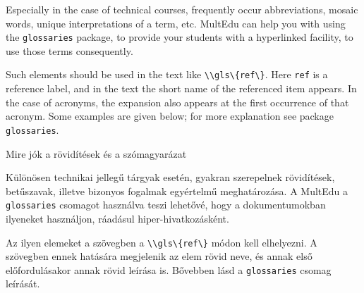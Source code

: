 




{
Especially in the case of technical courses, frequently occur abbreviations, mosaic words, unique interpretations of a term, etc. MultEdu can help you
with using the \lstinline|glossaries| package, to provide your students 
with a hyperlinked facility, to use those terms consequently.

Such elements should be used in the text like \lstinline|\\gls\{ref\}|.
Here \lstinline|ref| is a reference label, and in the text the short 
name of the referenced item appears. In the case of acronyms, the 
expansion also appears at the first occurrence of that acronym.
Some examples are given below; for more explanation see package \lstinline|glossaries|.

}
{Mire jók a rövidítések és a szómagyarázat}
{

Különösen technikai jellegű tárgyak esetén, gyakran szerepelnek 
rövidítések, betűszavak, illetve bizonyos fogalmak egyértelmű meghatározása.
A MultEdu a \lstinline|glossaries| csomagot használva teszi lehetővé,
hogy a dokumentumokban ilyeneket használjon, ráadásul hiper-hivatkozásként.
 
Az ilyen elemeket a szövegben  a \lstinline|\\gls\{ref\}| módon kell elhelyezni.
A szövegben ennek hatására megjelenik az elem rövid neve, és annak első
előfordulásakor annak rövid leírása is. Bővebben lásd a \lstinline|glossaries| 
csomag leírását.
}

